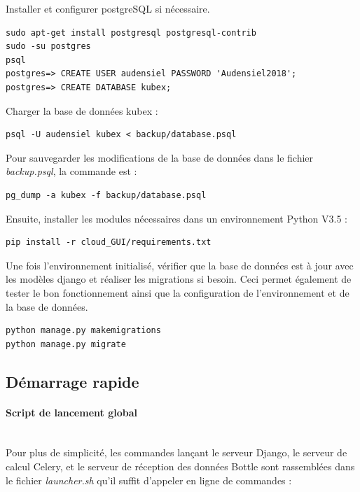 \documentclass[a4paper]{report}
\begin{document}
Installer et configurer postgreSQL si nécessaire.

\begin{verbatim}
sudo apt-get install postgresql postgresql-contrib
sudo -su postgres
psql
postgres=> CREATE USER audensiel PASSWORD 'Audensiel2018';
postgres=> CREATE DATABASE kubex;
\end{verbatim}

Charger la base de données kubex :

\begin{verbatim}
psql -U audensiel kubex < backup/database.psql
\end{verbatim}

Pour sauvegarder les modifications de la base de données dans le fichier \emph{backup.psql}, la commande est :

\begin{verbatim}pg_dump -a kubex -f backup/database.psql\end{verbatim}

Ensuite, installer les modules nécessaires dans un environnement Python V3.5 :

\begin{verbatim}
pip install -r cloud_GUI/requirements.txt
\end{verbatim}

Une fois l'environnement initialisé, vérifier que la base de données est à jour avec les modèles django et réaliser les migrations si besoin. Ceci permet également de tester le bon fonctionnement ainsi que la configuration de l'environnement et de la base de données.

\begin{verbatim}
python manage.py makemigrations
python manage.py migrate
\end{verbatim}



\subsection{Démarrage rapide}
\label{subsec:quickstart}

\paragraph{Script de lancement global}~\\
Pour plus de simplicité, les commandes lançant le serveur Django, le serveur de calcul Celery, et le serveur de réception des données Bottle sont rassemblées dans le fichier \emph{launcher.sh} qu'il suffit d'appeler en ligne de commandes :
\end{document}

